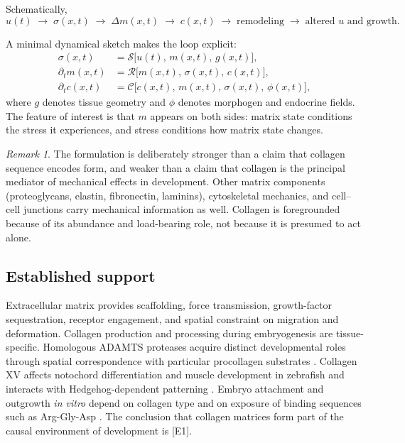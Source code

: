 \documentclass[11pt,a4paper]{article}
\theoremstyle{plain}
\theoremstyle{definition}
\theoremstyle{remark}
\newtheorem{remark}{Remark}[section]
\newcommand{\tier}[1]{\textup{\textsc{[#1]}}}
\newcommand{\Eone}{\tier{E1}}
\begin{document}
Schematically,
\[
u(t)\;\to\;\sigma(x,t)\;\to\;\Delta m(x,t)\;\to\;c(x,t)\;\to\;\text{remodeling}\;\to\;\text{altered }u\text{ and growth}.
\]

A minimal dynamical sketch makes the loop explicit:
\begin{align}
\sigma(x,t) &= \mathcal{S}\big[u(t),\, m(x,t),\, g(x,t)\big], \label{eq:stress}\\
\partial_t m(x,t) &= \mathcal{R}\big[m(x,t),\, \sigma(x,t),\, c(x,t)\big], \label{eq:remodel}\\
\partial_t c(x,t) &= \mathcal{C}\big[c(x,t),\, m(x,t),\, \sigma(x,t),\, \phi(x,t)\big], \label{eq:cell}
\end{align}
where $g$ denotes tissue geometry and $\phi$ denotes morphogen and endocrine fields. The feature of interest is that $m$ appears on both sides: matrix state conditions the stress it experiences, and stress conditions how matrix state changes.

\begin{remark}
The formulation is deliberately stronger than a claim that collagen sequence encodes form, and weaker than a claim that collagen is the principal mediator of mechanical effects in development. Other matrix components (proteoglycans, elastin, fibronectin, laminins), cytoskeletal mechanics, and cell--cell junctions carry mechanical information as well. Collagen is foregrounded because of its abundance and load-bearing role, not because it is presumed to act alone.
\end{remark}

\subsection{Established support}

Extracellular matrix provides scaffolding, force transmission, growth-factor sequestration, receptor engagement, and spatial constraint on migration and deformation. Collagen production and processing during embryogenesis are tissue-specific. Homologous ADAMTS proteases acquire distinct developmental roles through spatial correspondence with particular procollagen substrates \cite{legoff2006}. Collagen XV affects notochord differentiation and muscle development in zebrafish and interacts with Hedgehog-dependent patterning \cite{pagnon2008}. Embryo attachment and outgrowth \emph{in vitro} depend on collagen type and on exposure of binding sequences such as Arg-Gly-Asp \cite{armant1988}. The conclusion that collagen matrices form part of the causal environment of development is \Eone.
\end{document}
